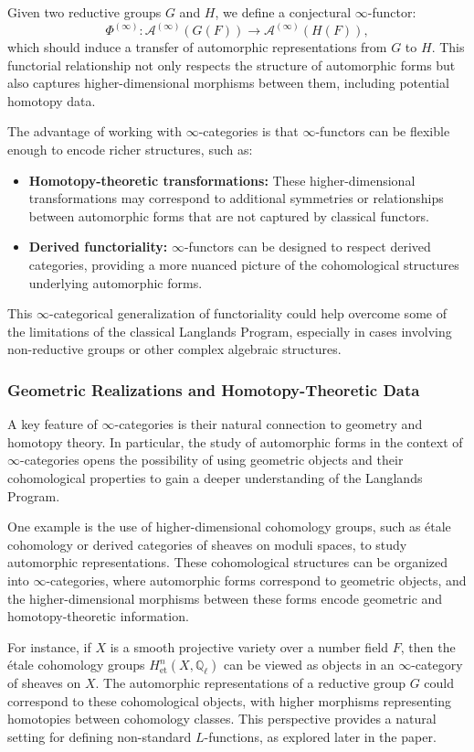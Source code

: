 \documentclass{article}
\theoremstyle{remark}
\begin{document}
Given two reductive groups $G$ and $H$, we define a conjectural $\infty$-functor:
\[
\Phi^{(\infty)}: \mathcal{A}^{(\infty)}(G(F)) \to \mathcal{A}^{(\infty)}(H(F)),
\]
which should induce a transfer of automorphic representations from $G$ to $H$. This functorial relationship not only respects the structure of automorphic forms but also captures higher-dimensional morphisms between them, including potential homotopy data.

The advantage of working with $\infty$-categories is that $\infty$-functors can be flexible enough to encode richer structures, such as:
\begin{itemize}
    \item \textbf{Homotopy-theoretic transformations:} These higher-dimensional transformations may correspond to additional symmetries or relationships between automorphic forms that are not captured by classical functors.
    \item \textbf{Derived functoriality:} $\infty$-functors can be designed to respect derived categories, providing a more nuanced picture of the cohomological structures underlying automorphic forms.
\end{itemize}
This $\infty$-categorical generalization of functoriality could help overcome some of the limitations of the classical Langlands Program, especially in cases involving non-reductive groups or other complex algebraic structures.

\subsubsection{Geometric Realizations and Homotopy-Theoretic Data}

A key feature of $\infty$-categories is their natural connection to geometry and homotopy theory. In particular, the study of automorphic forms in the context of $\infty$-categories opens the possibility of using geometric objects and their cohomological properties to gain a deeper understanding of the Langlands Program.

One example is the use of higher-dimensional cohomology groups, such as étale cohomology or derived categories of sheaves on moduli spaces, to study automorphic representations. These cohomological structures can be organized into $\infty$-categories, where automorphic forms correspond to geometric objects, and the higher-dimensional morphisms between these forms encode geometric and homotopy-theoretic information.

For instance, if $X$ is a smooth projective variety over a number field $F$, then the étale cohomology groups $H^n_{\text{et}}(X, \mathbb{Q}_\ell)$ can be viewed as objects in an $\infty$-category of sheaves on $X$. The automorphic representations of a reductive group $G$ could correspond to these cohomological objects, with higher morphisms representing homotopies between cohomology classes. This perspective provides a natural setting for defining non-standard $L$-functions, as explored later in the paper.
\end{document}
